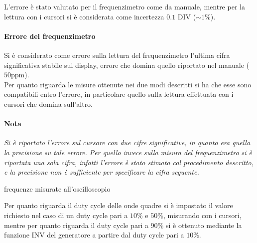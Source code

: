 \documentclass[10pt,a4paper]{article}
\begin{document}
L'errore è stato valutato per il frequenzimetro come da manuale, mentre per la lettura con i cursori si è considerata come incertezza $0.1$ DIV ($\sim 1\%$).

\paragraph{Errore del frequenzimetro} Si è considerato come errore sulla lettura del frequenzimetro l'ultima cifra significativa stabile sul display, errore che domina quello riportato nel manuale ($50$ppm).
\\

Per quanto riguarda le misure ottenute nei due modi descritti si ha che esse sono compatibili entro l'errore, in particolare quello sulla lettura effettuata con i cursori che domina sull'altro.

\paragraph{Nota} \emph{Si è riportato l'errore sul cursore con due cifre significative, in quanto era quella la precisione su tale errore. Per quello invece sulla misura del frequenzimetro si è riportata una sola cifra, infatti l'errore è stato stimato col procedimento descritto, e la precisione non è sufficiente per specificare la cifra seguente.}

\begin{table}[h]
\centering

\caption{frequenze misurate all'oscilloscopio}
\end{table}

Per quanto riguarda il duty cycle delle onde quadre si è impostato il valore richiesto nel caso di un duty cycle pari a $10\%$ e $50\%$, misurando con i cursori, mentre per quanto riguarda il duty cycle pari a $90\%$ si è ottenuto mediante la funzione INV del generatore a partire dal duty cycle pari a $10\%$.
\end{document}
